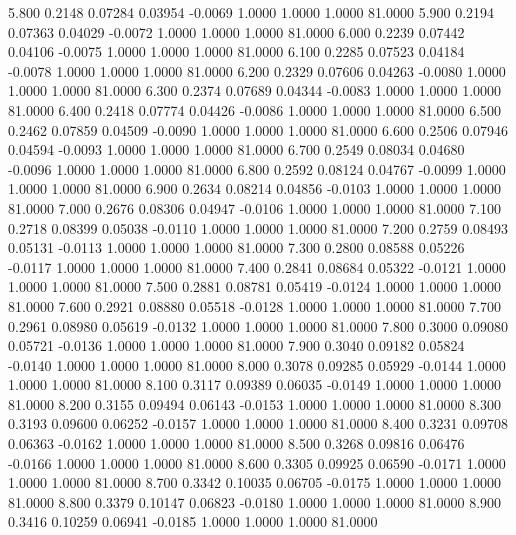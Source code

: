    5.800   0.2148   0.07284   0.03954  -0.0069   1.0000   1.0000   1.0000  81.0000
   5.900   0.2194   0.07363   0.04029  -0.0072   1.0000   1.0000   1.0000  81.0000
   6.000   0.2239   0.07442   0.04106  -0.0075   1.0000   1.0000   1.0000  81.0000
   6.100   0.2285   0.07523   0.04184  -0.0078   1.0000   1.0000   1.0000  81.0000
   6.200   0.2329   0.07606   0.04263  -0.0080   1.0000   1.0000   1.0000  81.0000
   6.300   0.2374   0.07689   0.04344  -0.0083   1.0000   1.0000   1.0000  81.0000
   6.400   0.2418   0.07774   0.04426  -0.0086   1.0000   1.0000   1.0000  81.0000
   6.500   0.2462   0.07859   0.04509  -0.0090   1.0000   1.0000   1.0000  81.0000
   6.600   0.2506   0.07946   0.04594  -0.0093   1.0000   1.0000   1.0000  81.0000
   6.700   0.2549   0.08034   0.04680  -0.0096   1.0000   1.0000   1.0000  81.0000
   6.800   0.2592   0.08124   0.04767  -0.0099   1.0000   1.0000   1.0000  81.0000
   6.900   0.2634   0.08214   0.04856  -0.0103   1.0000   1.0000   1.0000  81.0000
   7.000   0.2676   0.08306   0.04947  -0.0106   1.0000   1.0000   1.0000  81.0000
   7.100   0.2718   0.08399   0.05038  -0.0110   1.0000   1.0000   1.0000  81.0000
   7.200   0.2759   0.08493   0.05131  -0.0113   1.0000   1.0000   1.0000  81.0000
   7.300   0.2800   0.08588   0.05226  -0.0117   1.0000   1.0000   1.0000  81.0000
   7.400   0.2841   0.08684   0.05322  -0.0121   1.0000   1.0000   1.0000  81.0000
   7.500   0.2881   0.08781   0.05419  -0.0124   1.0000   1.0000   1.0000  81.0000
   7.600   0.2921   0.08880   0.05518  -0.0128   1.0000   1.0000   1.0000  81.0000
   7.700   0.2961   0.08980   0.05619  -0.0132   1.0000   1.0000   1.0000  81.0000
   7.800   0.3000   0.09080   0.05721  -0.0136   1.0000   1.0000   1.0000  81.0000
   7.900   0.3040   0.09182   0.05824  -0.0140   1.0000   1.0000   1.0000  81.0000
   8.000   0.3078   0.09285   0.05929  -0.0144   1.0000   1.0000   1.0000  81.0000
   8.100   0.3117   0.09389   0.06035  -0.0149   1.0000   1.0000   1.0000  81.0000
   8.200   0.3155   0.09494   0.06143  -0.0153   1.0000   1.0000   1.0000  81.0000
   8.300   0.3193   0.09600   0.06252  -0.0157   1.0000   1.0000   1.0000  81.0000
   8.400   0.3231   0.09708   0.06363  -0.0162   1.0000   1.0000   1.0000  81.0000
   8.500   0.3268   0.09816   0.06476  -0.0166   1.0000   1.0000   1.0000  81.0000
   8.600   0.3305   0.09925   0.06590  -0.0171   1.0000   1.0000   1.0000  81.0000
   8.700   0.3342   0.10035   0.06705  -0.0175   1.0000   1.0000   1.0000  81.0000
   8.800   0.3379   0.10147   0.06823  -0.0180   1.0000   1.0000   1.0000  81.0000
   8.900   0.3416   0.10259   0.06941  -0.0185   1.0000   1.0000   1.0000  81.0000
